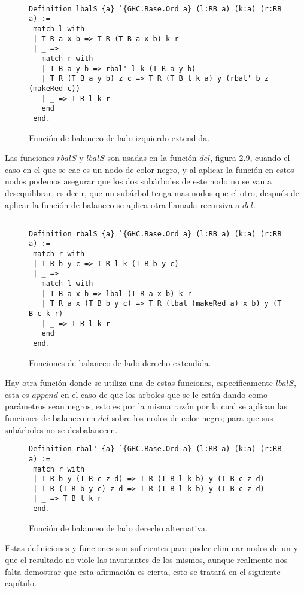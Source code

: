\begin{figure}
\centering
\captionsetup{justification=centering}
\begin{verbatim}

Definition lbalS {a} `{GHC.Base.Ord a} (l:RB a) (k:a) (r:RB a) :=
 match l with
 | T R a x b => T R (T B a x b) k r
 | _ =>
   match r with
   | T B a y b => rbal' l k (T R a y b)
   | T R (T B a y b) z c => T R (T B l k a) y (rbal' b z (makeRed c))
   | _ => T R l k r
   end
 end.

\end{verbatim}
\caption{Funci\'on de balanceo de lado izquierdo extendida.}
\end{figure}

Las funciones $rbalS$ y $lbalS$ son usadas en la funci\'on $del$, figura 2.9, cuando el caso en el
que se cae es un nodo de color negro, y al aplicar la funci\'on en estos nodos podemos asegurar
que los dos subárboles de este nodo no se van a desequilibrar, es decir, que un subárbol tenga mas
nodos que el otro, después de aplicar la función de balanceo se aplica otra llamada recursiva a
$del$.


\begin{figure}
\centering
\captionsetup{justification=centering}
\begin{verbatim}

Definition rbalS {a} `{GHC.Base.Ord a} (l:RB a) (k:a) (r:RB a) :=
 match r with
 | T R b y c => T R l k (T B b y c)
 | _ =>
   match l with
   | T B a x b => lbal (T R a x b) k r
   | T R a x (T B b y c) => T R (lbal (makeRed a) x b) y (T B c k r)
   | _ => T R l k r
   end
 end.

\end{verbatim}
\caption{Funciones de balanceo de lado derecho extendida.}
\end{figure}

Hay otra función donde se utiliza una de estas funciones, específicamente $lbalS$, esta es $append$
en el caso de que los arboles que se le están dando como parámetros sean negros, esto es por la
misma razón por la cual se aplican las funciones de balanceo en $del$ sobre los nodos de color
negro; para que sus subárboles no se desbalanceen.

\begin{figure}
\centering
\captionsetup{justification=centering}
\begin{verbatim}
Definition rbal' {a} `{GHC.Base.Ord a} (l:RB a) (k:a) (r:RB a) :=
 match r with
 | T R b y (T R c z d) => T R (T B l k b) y (T B c z d)
 | T R (T R b y c) z d => T R (T B l k b) y (T B c z d)
 | _ => T B l k r
 end.

\end{verbatim}
\caption{Funci\'on de balanceo de lado derecho alternativa.}
\end{figure}

Estas definiciones y funciones son suficientes para poder eliminar nodos de un {\arn} y que el
resultado no viole las invariantes de los mismos, aunque realmente nos falta demostrar que esta
afirmaci\'on es cierta, esto se tratar\'a en el siguiente cap\'itulo.
